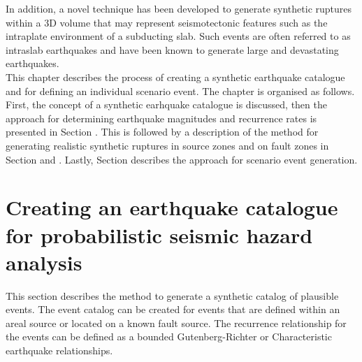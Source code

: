 In addition, a novel technique has been developed to generate synthetic ruptures within a 3D volume that may represent seismotectonic 
features such as the intraplate environment of a subducting slab. Such events are often referred to as intraslab earthquakes and have been known
to generate large and devastating earthquakes. \\

This chapter describes the process of creating a synthetic earthquake catalogue and for defining an individual scenario event. 
The chapter is organised as follows. First, the concept of a synthetic earhquake catalogue is discussed, then the approach for 
determining earthquake magnitudes and recurrence rates is presented in Section . This is followed by a
description of the method for generating realistic synthetic ruptures in source zones and on fault zones in Section  and 
. Lastly, Section  describes the approach for scenario event generation.

\section{Creating an earthquake catalogue for probabilistic seismic hazard analysis}%
\label{sec:source-EQcat}

This section describes the method to generate a synthetic catalog of plausible events. The event catalog can be
created for events that are defined within an areal source or located on a known fault source. The recurrence relationship for the events
can be defined as a bounded Gutenberg-Richter or Characteristic earthquake relationships.

